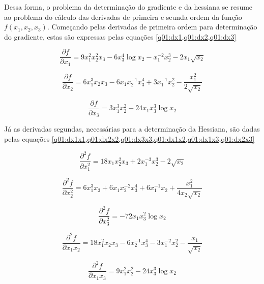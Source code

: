\documentclass[10pt, a4paper]{article}
\begin{document}
Dessa forma, o problema da determinação do gradiente e da hessiana se resume ao problema do cálculo das derivadas de primeira 
e seunda ordem da função $f(x_1, x_2, x_3)$. Começando pelas derivadas de primeira ordem para determinação do gradiente, estas são 
expressas pelas equações \cref{q01:dx1,q01:dx2,q01:dx3}

\begin{equation}\label{q01:dx1}
    \frac{\partial f}{\partial x_1} = 9x_1^2x_2^2x_3 - 6x_3^4\log{x_2} - x_1^{-2}x_2^3 - 2x_1\sqrt{x_2}
\end{equation}

\begin{equation}\label{q01:dx2}
    \frac{\partial f}{\partial x_2} = 6x_1^3x_2x_3 - 6x_1x_2^{-1}x_3^4 + 3x_1^{-1}x_2^2 - \frac{x_1^2}{2\sqrt{x_2}}
\end{equation}

\begin{equation}\label{q01:dx3}
    \frac{\partial f}{\partial x_3} = 3x_1^3x_2^2 - 24x_1x_3^3\log{x_2}
\end{equation}

Já as derivadas segundas, necessárias para a determinação da Hessiana, são dadas pelas equações 
\cref{q01:dx1x1,q01:dx2x2,q01:dx3x3,q01:dx1x2,q01:dx1x3,q01:dx2x3}

\begin{equation}\label{q01:dx1x1}
    \frac{\partial^2 f}{\partial x_1^2} = 18x_1x_2^2x_3 + 2x_1^{-3}x_2^3 - 2\sqrt{x_2}
\end{equation}

\begin{equation}\label{q01:dx2x2}
    \frac{\partial^2 f}{\partial x_2^2} = 6x_1^3x_3 + 6x_1x_2^{-2}x_3^4 + 6x_1^{-1}x_2 + \frac{x_1^2}{4x_2\sqrt{x_2}}
\end{equation}

\begin{equation}\label{q01:dx3x3}
    \frac{\partial^2 f}{\partial x_3^2} = - 72x_1x_3^2\log{x_2}
\end{equation}

\begin{equation}\label{q01:dx1x2}
    \frac{\partial^2 f}{\partial x_1x_2} = 18x_1^2x_2x_3 - 6x_2^{-1}x_3^4 - 3x_1^{-2}x_2^2 - \frac{x_1}{\sqrt{x_2}}
\end{equation}

\begin{equation}\label{q01:dx1x3}
    \frac{\partial^2 f}{\partial x_1x_3} = 9x_1^2x_2^2 - 24x_3^3\log{x_2}
\end{equation}
\end{document}
